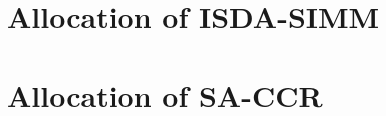 \documentclass[../Thesis_AHoecherl.tex]{subfiles}
\begin{document}
    \section{Allocation of ISDA-SIMM}
    \section{Allocation of SA-CCR}
\end{document}
